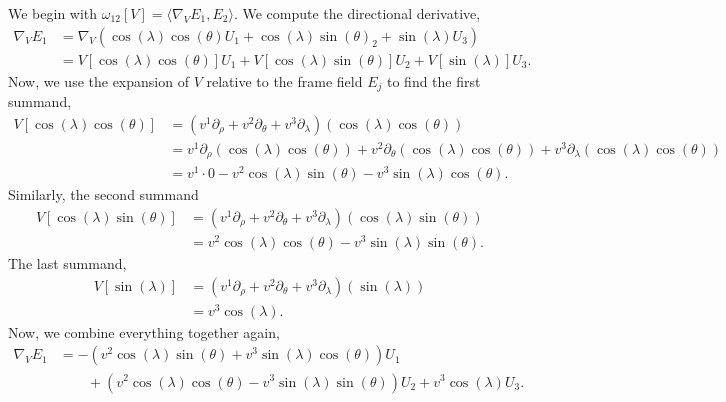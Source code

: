 \M We begin with $\omega_{12}[V] = \langle\nabla_{V}E_{1},E_{2}\rangle$.
We compute the directional derivative,
\begin{subequations}
  \begin{align}
    \nabla_{V}E_{1}
    &=\nabla_{V}(\cos(\lambda)\cos(\theta)U_{1} +
    \cos(\lambda)\sin(\theta)_{2} + \sin(\lambda)U_{3})\\
    &= V[\cos(\lambda)\cos(\theta)]U_{1}
    + V[\cos(\lambda)\sin(\theta)]U_{2} + V[\sin(\lambda)]U_{3}.
  \end{align}
\end{subequations}
Now, we use the expansion of $V$ relative to the frame field $E_{j}$ to
find the first summand,
\begin{subequations}
\begin{align}
V[\cos(\lambda)\cos(\theta)] &= (v^{1}\partial_{\rho} +
v^{2}\partial_{\theta}+v^{3}\partial_{\lambda})(\cos(\lambda)\cos(\theta))\\
&=v^{1}\partial_{\rho}(\cos(\lambda)\cos(\theta))
+v^{2}\partial_{\theta}(\cos(\lambda)\cos(\theta))
+v^{3}\partial_{\lambda}(\cos(\lambda)\cos(\theta))\\
&=v^{1}\cdot0 - v^{2}\cos(\lambda)\sin(\theta)-v^{3}\sin(\lambda)\cos(\theta).
\end{align}
\end{subequations}
Similarly, the second summand
\begin{subequations}
\begin{align}
V[\cos(\lambda)\sin(\theta)]
&=  (v^{1}\partial_{\rho} +
v^{2}\partial_{\theta}+v^{3}\partial_{\lambda})(\cos(\lambda)\sin(\theta))\\
&= v^{2}\cos(\lambda)\cos(\theta)-v^{3}\sin(\lambda)\sin(\theta).
\end{align}
\end{subequations}
The last summand,
\begin{subequations}
\begin{align}
V[\sin(\lambda)] &= (v^{1}\partial_{\rho} +
v^{2}\partial_{\theta}+v^{3}\partial_{\lambda})(\sin(\lambda))\\
&=v^{3}\cos(\lambda).
\end{align}
\end{subequations}
Now, we combine everything together again,
\begin{equation}
  \begin{split}
\nabla_{V}E_{1}
&=-\left(v^{2}\cos(\lambda)\sin(\theta)+v^{3}\sin(\lambda)\cos(\theta)\right)U_{1}\\
&\qquad+\left(v^{2}\cos(\lambda)\cos(\theta)-v^{3}\sin(\lambda)\sin(\theta)\right)U_{2}
+v^{3}\cos(\lambda)U_{3}.
  \end{split}
\end{equation}
